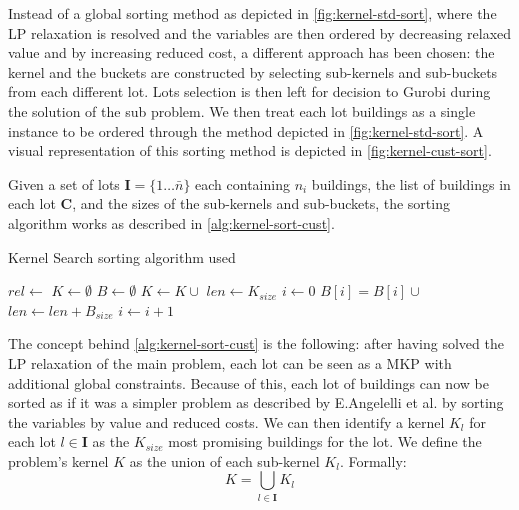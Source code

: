 \documentclass[a4paper, twocolumn, oneside, 10pt]{article}
\begin{document}
Instead of a global sorting method as depicted in \cref{fig:kernel-std-sort}, where the \ac{LP} relaxation is resolved and the variables are then ordered by decreasing relaxed value and by increasing reduced cost, a different approach has been chosen: the kernel and the buckets are constructed by selecting sub-kernels and sub-buckets from each different lot. Lots selection is then left for decision to Gurobi during the solution of the sub problem. We then treat each lot buildings as a single instance to be ordered through the method depicted in \cref{fig:kernel-std-sort}. A visual representation of this sorting method is depicted in \cref{fig:kernel-cust-sort}. 

Given a set of lots \(\mathbf{I} = \big\{1\ldots\bar{n}\}\) each containing \(n_i\) buildings, the list of buildings in each lot \(\mathbf{C}\), and the sizes of the sub-kernels and sub-buckets, the sorting algorithm works as described in \cref{alg:kernel-sort-cust}.

\begin{algorithm}
	\caption{Kernel Search sorting algorithm used}\label{alg:kernel-sort-cust}
	\begin{algorithmic}
			\State $rel \gets$ 
			\State $K \gets \emptyset$%
			\State $B \gets \emptyset$%
				\State {}%
				\State $K \gets K \cup $
				\State $len \gets K_{size}$%
				\State $i \gets 0$%
					\State $B[i] = B[i] \cup$
					\State $len \gets len + B_{size}$%
					\State $i \gets i + 1$%
				\EndWhile%
			\EndFor%
			\State {}%
		\EndFunction%
	\end{algorithmic}
\end{algorithm}

The concept behind \cref{alg:kernel-sort-cust} is the following: after having solved the \ac{LP} relaxation of the main problem, each lot can be seen as a \ac{MKP} with additional global constraints. Because of this, each lot of buildings can now be sorted as if it was a simpler problem as described by E.Angelelli et al.\cite{angelelli2010kernel} by sorting the variables by value and reduced costs. 
We can then identify a kernel \(K_l\) for each lot \(l \in \textbf{I}\) as the \(K_{size}\) most promising buildings for the lot. We define the problem's kernel \(K\) as the union of each sub-kernel \(K_l\). Formally: \[K = \bigcup_{l \in \mathbf{I}} K_l\]
\end{document}
